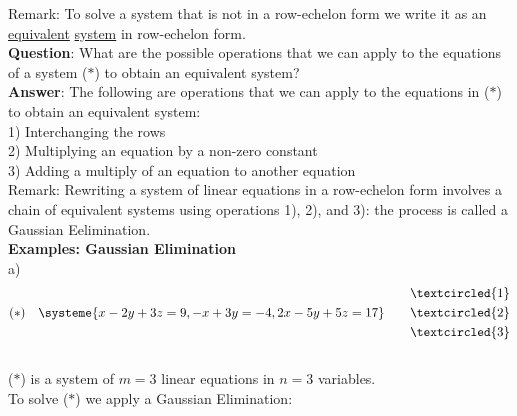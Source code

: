 \documentclass{jhwhw}
\begin{document}
Remark: To solve a system that is not in a row-echelon form we write it as an \underline{equivalent} \underline{system} in row-echelon form.
\\

\textbf{Question}: What are the possible operations that we can apply to the equations of a system (\(\ast\)) to obtain an equivalent system?
\\
\textbf{Answer}: The following are operations that we can apply to the equations in (\(\ast\)) to obtain an equivalent system:\\
1) Interchanging the rows \\
2) Multiplying an equation by a non-zero constant \\
3) Adding a multiply of an equation to another equation
\\

 Remark: Rewriting a system of linear equations in a row-echelon form involves a chain of equivalent systems using operations 1), 2), and 3): the process is called a Gaussian Eelimination.
 \\

\textbf{Examples: Gaussian Elimination}
\\

a) \begin{align*} 
    (\ast) \quad \systeme{x-2y+3z=9, -x+3y=-4, 2x-5y+5z=17} \quad \quad \begin{aligned} &\textcircled{1} \\ &\textcircled{2} \\ &\textcircled{3}\end{aligned}
\end{align*}
\\
(\(\ast\)) is a system of \(m=3\) linear equations in \(n=3\) variables.
\\
To solve (\(\ast\)) we apply a Gaussian Elimination:
\\
\end{document}
